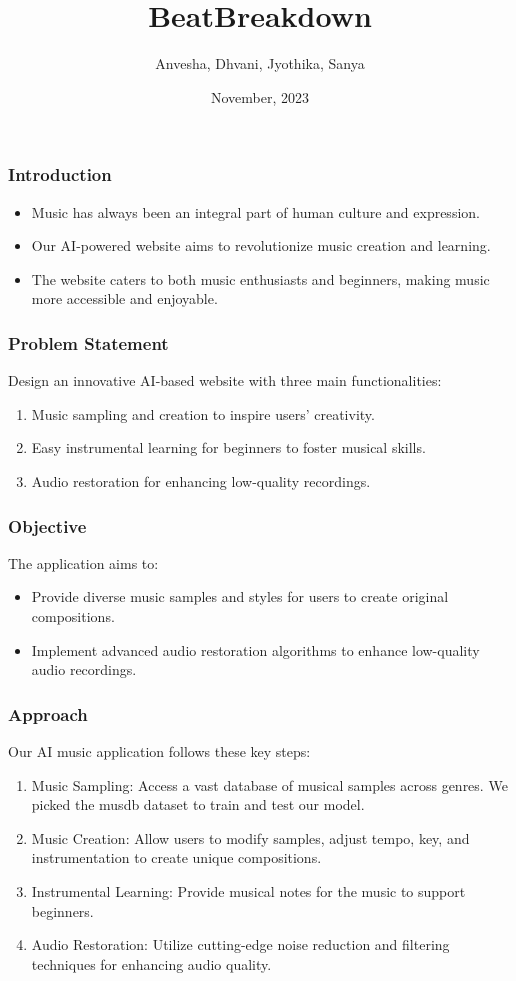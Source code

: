 \documentclass{beamer}
\title{ BeatBreakdown }
\author { Anvesha,  Dhvani,  Jyothika,  Sanya }
\date{November, 2023}
\begin{document}
\begin{frame}
  \titlepage
\end{frame}

\begin{frame}
  \frametitle{Introduction}
  \begin{itemize}
    \item Music has always been an integral part of human culture and 
expression.
    \item Our AI-powered website aims to revolutionize music 
creation and learning.
    \item The website caters to both music enthusiasts and beginners, 
making music more accessible and enjoyable.
  \end{itemize}
\end{frame}

\begin{frame}
  \frametitle{Problem Statement}
  Design an innovative AI-based website with three main 
functionalities:
  \begin{enumerate}
    \item Music sampling and creation to inspire users' creativity.
    \item Easy instrumental learning for beginners to foster musical skills.
    \item Audio restoration for enhancing low-quality recordings.
  \end{enumerate}
\end{frame}

\begin{frame}
  \frametitle{Objective}
  The application aims to:
  \begin{itemize}
    \item Provide diverse music samples and styles for users to create 
original compositions.
    \item Implement advanced audio restoration algorithms to enhance 
low-quality audio recordings.
  \end{itemize}
\end{frame}

\begin{frame}
  \frametitle{Approach}
  Our AI music application follows these key steps:
  \begin{enumerate}
    \item Music Sampling: Access a vast database of musical samples across 
genres. We picked the musdb dataset to train and test our model.
    \item Music Creation: Allow users to modify samples, adjust tempo, key, 
and instrumentation to create unique compositions.
    \item Instrumental Learning: Provide musical notes for the music to 
support beginners.
    \item Audio Restoration: Utilize cutting-edge noise reduction and 
filtering techniques for enhancing audio quality.
  \end{enumerate}
\end{frame}
\end{document}
